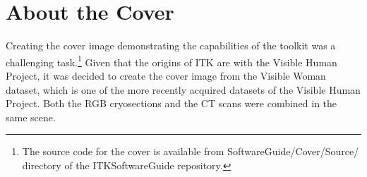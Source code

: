 \small

\chapter*{About the Cover}

Creating the cover image demonstrating the capabilities of the toolkit was a
challenging task.\footnote{The source code for the cover is available from
SoftwareGuide/Cover/Source/ directory of the ITKSoftwareGuide repository.}
Given that the origins of ITK are with the Visible Human Project, it was
decided to create the cover image from the Visible Woman dataset, which is one
of the more recently acquired datasets of the Visible Human Project.  Both the
RGB cryosections and the CT scans were combined in the same scene.

